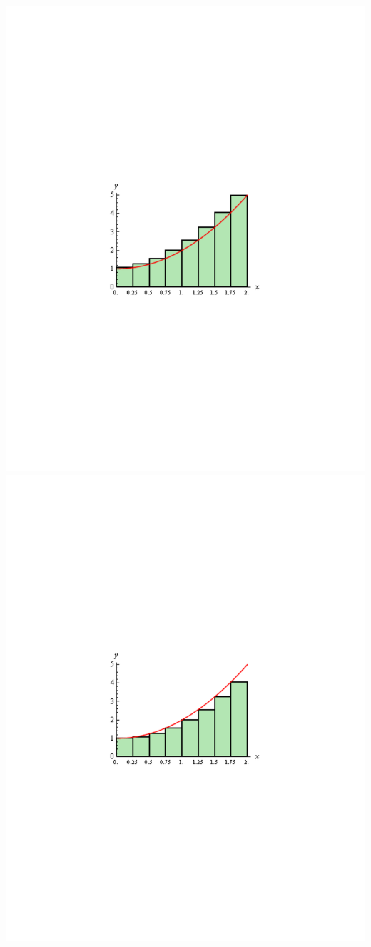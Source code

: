 \documentclass[11pt]{article}
\theoremstyle{definition}
\theoremstyle{remark}
\begin{document}
\begin{itemize}
\begin{center}
\includegraphics[scale=0.5]{img/integrals_morerectangleR.pdf}
\includegraphics[scale=0.5]{img/integrals_morerectangleL.pdf}\\

\end{center}
\end{itemize}
\end{document}
